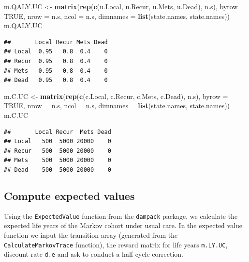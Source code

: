 \documentclass[]{article}
\newenvironment{Shaded}{\begin{snugshade}}{\end{snugshade}}
\newcommand{\KeywordTok}[1]{\textcolor[rgb]{0.13,0.29,0.53}{\textbf{#1}}}
\newcommand{\DataTypeTok}[1]{\textcolor[rgb]{0.13,0.29,0.53}{#1}}
\newcommand{\StringTok}[1]{\textcolor[rgb]{0.31,0.60,0.02}{#1}}
\newcommand{\OtherTok}[1]{\textcolor[rgb]{0.56,0.35,0.01}{#1}}
\newcommand{\NormalTok}[1]{#1}
\theoremstyle{definition}
\theoremstyle{definition}
\theoremstyle{definition}
\theoremstyle{remark}
\begin{document}
\begin{Shaded}
\begin{Highlighting}[]
\NormalTok{m.QALY.UC <-}\StringTok{ }\KeywordTok{matrix}\NormalTok{(}\KeywordTok{rep}\NormalTok{(}\KeywordTok{c}\NormalTok{(u.Local, u.Recur, u.Mets, u.Dead), n.s),}
                    \DataTypeTok{byrow =} \OtherTok{TRUE}\NormalTok{,}
                 \DataTypeTok{nrow =}\NormalTok{ n.s, }\DataTypeTok{ncol =}\NormalTok{ n.s, }
                 \DataTypeTok{dimnames =} \KeywordTok{list}\NormalTok{(state.names, state.names))}
\NormalTok{m.QALY.UC}
\end{Highlighting}
\end{Shaded}

\begin{verbatim}
##       Local Recur Mets Dead
## Local  0.95   0.8  0.4    0
## Recur  0.95   0.8  0.4    0
## Mets   0.95   0.8  0.4    0
## Dead   0.95   0.8  0.4    0
\end{verbatim}

\begin{Shaded}
\begin{Highlighting}[]
\NormalTok{m.C.UC <-}\StringTok{ }\KeywordTok{matrix}\NormalTok{(}\KeywordTok{rep}\NormalTok{(}\KeywordTok{c}\NormalTok{(c.Local, c.Recur, c.Mets, c.Dead), n.s),}
                 \DataTypeTok{byrow =} \OtherTok{TRUE}\NormalTok{,}
                 \DataTypeTok{nrow =}\NormalTok{ n.s, }\DataTypeTok{ncol =}\NormalTok{ n.s, }
                 \DataTypeTok{dimnames =} \KeywordTok{list}\NormalTok{(state.names, state.names))}
\NormalTok{m.C.UC}
\end{Highlighting}
\end{Shaded}

\begin{verbatim}
##       Local Recur  Mets Dead
## Local   500  5000 20000    0
## Recur   500  5000 20000    0
## Mets    500  5000 20000    0
## Dead    500  5000 20000    0
\end{verbatim}

\subsection{Compute expected values}\label{compute-expected-values}

Using the \texttt{ExpectedValue} function from the \texttt{dampack}
package, we calculate the expected life years of the Markov cohort under
usual care. In the expected value function we input the transition array
(generated from the \texttt{CalculateMarkovTrace} function), the reward
matrix for life years \texttt{m.LY.UC}, discount rate \texttt{d.e} and
ask to conduct a half cycle correction.
\end{document}
